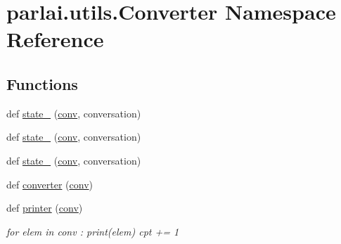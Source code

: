 \hypertarget{namespaceparlai_1_1utils_1_1Converter}{}\section{parlai.\+utils.\+Converter Namespace Reference}
\label{namespaceparlai_1_1utils_1_1Converter}
\subsection*{Functions}
\begin{DoxyCompactItemize}
\item 
def \hyperlink{namespaceparlai_1_1utils_1_1Converter_a70095b67e171470e875dd9812d53fbc5}{state\+\_} (\hyperlink{namespaceparlai_1_1utils_1_1Converter_a13cb8defe67113796a6361ac8ddf7dc3}{conv}, conversation)
\item 
def \hyperlink{namespaceparlai_1_1utils_1_1Converter_a6e544c13c3304bc8e97127997e507bb3}{state\+\_} (\hyperlink{namespaceparlai_1_1utils_1_1Converter_a13cb8defe67113796a6361ac8ddf7dc3}{conv}, conversation)
\item 
def \hyperlink{namespaceparlai_1_1utils_1_1Converter_a051af07ed1e796ee044390b710646091}{state\+\_} (\hyperlink{namespaceparlai_1_1utils_1_1Converter_a13cb8defe67113796a6361ac8ddf7dc3}{conv}, conversation)
\item 
def \hyperlink{namespaceparlai_1_1utils_1_1Converter_abd079f987382596057ec8c630fa3db8c}{converter} (\hyperlink{namespaceparlai_1_1utils_1_1Converter_a13cb8defe67113796a6361ac8ddf7dc3}{conv})
\item 
def \hyperlink{namespaceparlai_1_1utils_1_1Converter_a2ef9c241b22f84ea3a4123efd90f29b6}{printer} (\hyperlink{namespaceparlai_1_1utils_1_1Converter_a13cb8defe67113796a6361ac8ddf7dc3}{conv})
\begin{DoxyCompactList}\small\item\em for elem in conv \+: print(elem) cpt += 1 \end{DoxyCompactList}\end{DoxyCompactItemize}
